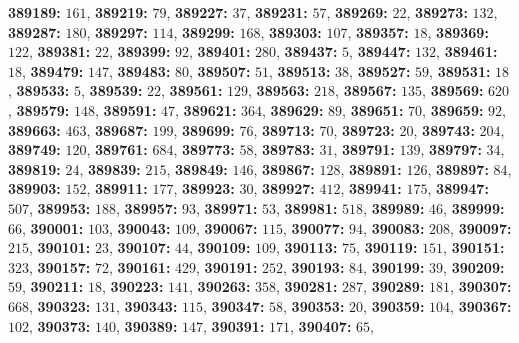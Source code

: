 \textsf{\bfseries 389189:} $161$, \textsf{\bfseries 389219:} $79$, \textsf{\bfseries 389227:} $37$, \textsf{\bfseries 389231:} $57$, \textsf{\bfseries 389269:} $22$, \textsf{\bfseries 389273:} $132$, \textsf{\bfseries 389287:} $180$, \textsf{\bfseries 389297:} $114$, \textsf{\bfseries 389299:} $168$, \textsf{\bfseries 389303:} $107$, \textsf{\bfseries 389357:} $18$, \textsf{\bfseries 389369:} $122$, \textsf{\bfseries 389381:} $22$, \textsf{\bfseries 389399:} $92$, \textsf{\bfseries 389401:} $280$, \textsf{\bfseries 389437:} $5$, \textsf{\bfseries 389447:} $132$, \textsf{\bfseries 389461:} $18$, \textsf{\bfseries 389479:} $147$, \textsf{\bfseries 389483:} $80$, \textsf{\bfseries 389507:} $51$, \textsf{\bfseries 389513:} $38$, \textsf{\bfseries 389527:} $59$, \textsf{\bfseries 389531:} $18$, \textsf{\bfseries 389533:} $5$, \textsf{\bfseries 389539:} $22$, \textsf{\bfseries 389561:} $129$, \textsf{\bfseries 389563:} $218$, \textsf{\bfseries 389567:} $135$, \textsf{\bfseries 389569:} $620$, \textsf{\bfseries 389579:} $148$, \textsf{\bfseries 389591:} $47$, \textsf{\bfseries 389621:} $364$, \textsf{\bfseries 389629:} $89$, \textsf{\bfseries 389651:} $70$, \textsf{\bfseries 389659:} $92$, \textsf{\bfseries 389663:} $463$, \textsf{\bfseries 389687:} $199$, \textsf{\bfseries 389699:} $76$, \textsf{\bfseries 389713:} $70$, \textsf{\bfseries 389723:} $20$, \textsf{\bfseries 389743:} $204$, \textsf{\bfseries 389749:} $120$, \textsf{\bfseries 389761:} $684$, \textsf{\bfseries 389773:} $58$, \textsf{\bfseries 389783:} $31$, \textsf{\bfseries 389791:} $139$, \textsf{\bfseries 389797:} $34$, \textsf{\bfseries 389819:} $24$, \textsf{\bfseries 389839:} $215$, \textsf{\bfseries 389849:} $146$, \textsf{\bfseries 389867:} $128$, \textsf{\bfseries 389891:} $126$, \textsf{\bfseries 389897:} $84$, \textsf{\bfseries 389903:} $152$, \textsf{\bfseries 389911:} $177$, \textsf{\bfseries 389923:} $30$, \textsf{\bfseries 389927:} $412$, \textsf{\bfseries 389941:} $175$, \textsf{\bfseries 389947:} $507$, \textsf{\bfseries 389953:} $188$, \textsf{\bfseries 389957:} $93$, \textsf{\bfseries 389971:} $53$, \textsf{\bfseries 389981:} $518$, \textsf{\bfseries 389989:} $46$, \textsf{\bfseries 389999:} $66$, \textsf{\bfseries 390001:} $103$, \textsf{\bfseries 390043:} $109$, \textsf{\bfseries 390067:} $115$, \textsf{\bfseries 390077:} $94$, \textsf{\bfseries 390083:} $208$, \textsf{\bfseries 390097:} $215$, \textsf{\bfseries 390101:} $23$, \textsf{\bfseries 390107:} $44$, \textsf{\bfseries 390109:} $109$, \textsf{\bfseries 390113:} $75$, \textsf{\bfseries 390119:} $151$, \textsf{\bfseries 390151:} $323$, \textsf{\bfseries 390157:} $72$, \textsf{\bfseries 390161:} $429$, \textsf{\bfseries 390191:} $252$, \textsf{\bfseries 390193:} $84$, \textsf{\bfseries 390199:} $39$, \textsf{\bfseries 390209:} $59$, \textsf{\bfseries 390211:} $18$, \textsf{\bfseries 390223:} $141$, \textsf{\bfseries 390263:} $358$, \textsf{\bfseries 390281:} $287$, \textsf{\bfseries 390289:} $181$, \textsf{\bfseries 390307:} $668$, \textsf{\bfseries 390323:} $131$, \textsf{\bfseries 390343:} $115$, \textsf{\bfseries 390347:} $58$, \textsf{\bfseries 390353:} $20$, \textsf{\bfseries 390359:} $104$, \textsf{\bfseries 390367:} $102$, \textsf{\bfseries 390373:} $140$, \textsf{\bfseries 390389:} $147$, \textsf{\bfseries 390391:} $171$, \textsf{\bfseries 390407:} $65$, 
